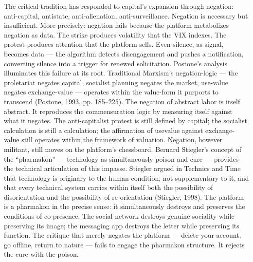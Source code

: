The critical tradition has responded to capital’s expansion through negation: anti-capital, antistate, anti-alienation, anti-surveillance. Negation is necessary but insufficient. More precisely: negation fails because the platform metabolizes negation as data. The strike produces volatility that the VIX indexes. The protest produces attention that the platform sells. Even silence, as signal, becomes data — the algorithm detects disengagement and pushes a notification, converting silence into a trigger for renewed solicitation. Postone’s analysis illuminates this failure at its root. Traditional Marxism’s negation-logic — the proletariat negates capital, socialist planning negates the market, use-value negates exchange-value — operates within the value-form it purports to transcend (Postone, 1993, pp. 185–225). The negation of abstract labor is itself abstract. It reproduces the commensuration logic by measuring itself against what it negates. The anti-capitalist protest is still defined by capital; the socialist calculation is still a calculation; the affirmation of usevalue against exchange-value still operates within the framework of valuation. Negation, however militant, still moves on the platform’s chessboard. Bernard Stiegler’s concept of the “pharmakon” — technology as simultaneously poison and cure — provides the technical articulation of this impasse. Stiegler argued in Technics and Time that technology is originary to the human condition, not supplementary to it, and that every technical system carries within itself both the possibility of disorientation and the possibility of re-orientation (Stiegler, 1998). The platform is a pharmakon in the precise sense: it simultaneously destroys and preserves the conditions of co-presence. The social network destroys genuine sociality while preserving its image; the messaging app destroys the letter while preserving its function. The critique that merely negates the platform — delete your account, go offline, return to nature — fails to engage the pharmakon structure. It rejects the cure with the poison.

